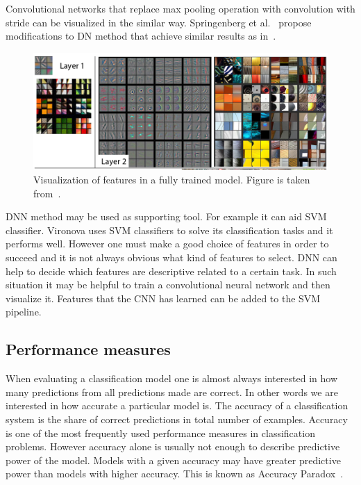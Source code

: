 \documentclass[a4paper, 11pt, table]{article}
\begin{document}
Convolutional networks that replace max pooling operation with convolution with stride can be visualized in the similar way. Springenberg et al.~\cite{DBLP:journals/corr/SpringenbergDBR14} propose modifications to DN method that achieve similar results as in~\cite{Zeiler2014}.

\begin{figure}[H]
\centering
\includegraphics[width=\textwidth]{zeiler_dnn_vis.png} 
\caption{Visualization of features in a fully trained model. Figure is taken from~\cite{Zeiler2014}.}\label{fig:dnn_vis}
\end{figure}

DNN method may be used as supporting tool. For example it can aid SVM classifier. Vironova uses SVM classifiers to solve its classification tasks and it performs well. However one must make a good choice of features in order to succeed and it is not always obvious what kind of features to select. DNN can help to decide which features are descriptive related to a certain task. In such situation it may be helpful to train a convolutional neural network and then visualize it. Features that the CNN has learned can be added to the SVM pipeline. 

\subsection{Performance measures}

When evaluating a classification model one is almost always interested in how many predictions from all predictions made are correct. In other words we are interested in how accurate a particular model is. The accuracy of a classification system is the share of correct predictions in total number of examples. Accuracy  is one of the most frequently used performance measures in classification problems. However accuracy alone is usually not enough to describe predictive power of the model. Models with a given accuracy may have greater predictive power than models with higher accuracy. This is known as Accuracy Paradox~\cite{zhu2007knowledge}.
\end{document}
